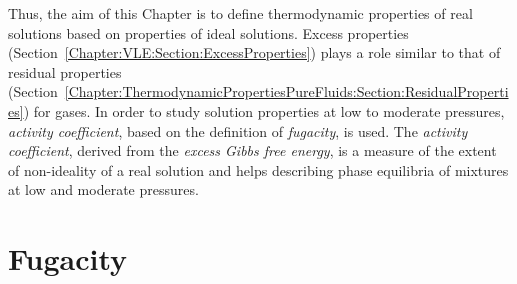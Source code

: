 Thus, the aim of this Chapter is to define thermodynamic properties of real solutions based on properties of ideal solutions. Excess properties (Section~\ref{Chapter:VLE:Section:ExcessProperties}) plays a role similar to that of residual properties (Section~\ref{Chapter:ThermodynamicPropertiesPureFluids:Section:ResidualProperties}) for gases. In order to study solution properties at low to moderate pressures, {\it activity coefficient}, based on the definition of {\it fugacity}, is used. The {\it activity coefficient}, derived from the {\it excess Gibbs free energy}, is a measure of the extent of non-ideality of a real solution and helps describing phase equilibria of mixtures at low and moderate pressures.


\section{Fugacity}\label{Chapter:SolutionThermodynamics:Section:FugacitySection}
